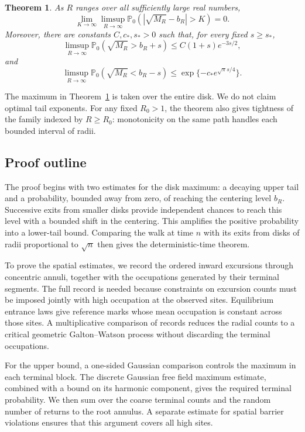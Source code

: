 \documentclass[11pt,letterpaper,reqno]{amsart}
\numberwithin{equation}{section}
\newtheorem{theorem}{Theorem}[section]
\theoremstyle{remark}
\begin{document}
\begin{theorem}\label{thm:disk}
As $R$ ranges over all sufficiently large real numbers,
\begin{equation}\label{eq:1.4}
\lim_{K\to\infty}\limsup_{R\to\infty}
\mathbb P_0\!\left(\left|\sqrt{M_R}-b_R\right|>K\right)=0.
\end{equation}
Moreover, there are constants $C,c_*,s_*>0$ such that, for every fixed $s\ge s_*$,
\begin{equation}\label{eq:1.6}
\limsup_{R\to\infty}\mathbb P_0(\sqrt{M_R}>b_R+s)
\le C(1+s)e^{-3s/2},
\end{equation}
and
\begin{equation}\label{eq:1.7}
\limsup_{R\to\infty}\mathbb P_0(\sqrt{M_R}<b_R-s)
\le\exp\{-c_*e^{\sqrt\pi s/4}\}.
\end{equation}
\end{theorem}

The maximum in Theorem~\ref{thm:disk} is taken over the entire disk. We do not claim optimal tail exponents. For any fixed $R_0>1$, the theorem also gives tightness of the family indexed by $R\ge R_0$: monotonicity on the same path handles each bounded interval of radii.

\subsection{Proof outline}\label{sec:outline}
The proof begins with two estimates for the disk maximum: a decaying upper tail and a probability, bounded away from zero, of reaching the centering level $b_R$. Successive exits from smaller disks provide independent chances to reach this level with a bounded shift in the centering. This amplifies the positive probability into a lower-tail bound. Comparing the walk at time $n$ with its exits from disks of radii proportional to $\sqrt n$ then gives the deterministic-time theorem.

To prove the spatial estimates, we record the ordered inward excursions through concentric annuli, together with the occupations generated by their terminal segments. The full record is needed because constraints on excursion counts must be imposed jointly with high occupation at the observed sites. Equilibrium entrance laws give reference marks whose mean occupation is constant across those sites. A multiplicative comparison of records reduces the radial counts to a critical geometric Galton--Watson process without discarding the terminal occupations.

For the upper bound, a one-sided Gaussian comparison controls the maximum in each terminal block. The discrete Gaussian free field maximum estimate, combined with a bound on its harmonic component, gives the required terminal probability. We then sum over the coarse terminal counts and the random number of returns to the root annulus. A separate estimate for spatial barrier violations ensures that this argument covers all high sites.
\end{document}

